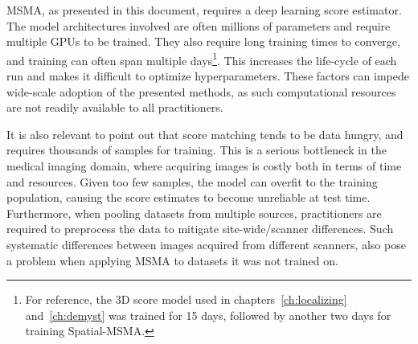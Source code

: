MSMA, as presented in this document, requires a deep learning score estimator. The model architectures involved are often millions of parameters and require multiple GPUs to be trained. They also require long training times to converge, and training can often span multiple days\footnote{For reference, the 3D score model used in chapters~\ref{ch:localizing} and~\ref{ch:demyst} was trained for 15 days, followed by another two days for training Spatial-MSMA. }. This increases the life-cycle of each run and makes it difficult to optimize hyperparameters. These factors can impede wide-scale adoption of the presented methods, as such computational resources are not readily available to all practitioners. 

It is also relevant to point out that score matching tends to be data hungry, and requires thousands of samples for training. This is a serious bottleneck in the medical imaging domain, where acquiring images is costly both in terms of time and resources. Given too few samples, the model can overfit to the training population, causing the score estimates to become unreliable at test time. Furthermore, when pooling datasets from multiple sources, practitioners are required to preprocess the data to mitigate site-wide/scanner differences. Such systematic differences between images acquired from different scanners, also pose a problem when applying MSMA to datasets it was not trained on.









